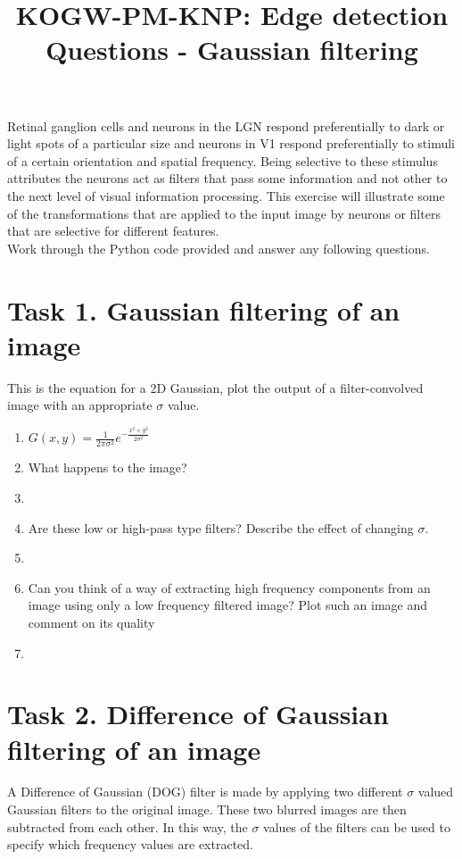 \documentclass[12pt,english]{scrartcl}
\title{KOGW-PM-KNP: Edge detection Questions - Gaussian filtering}
\begin{document}
\maketitle
\raggedright
Retinal ganglion cells and neurons in the LGN respond preferentially to dark or light spots of a particular size and neurons in V1 respond preferentially to stimuli of a certain orientation and spatial frequency. Being selective to these stimulus attributes the neurons act as filters that pass some information and not other to the next level of visual information processing. This exercise will illustrate some of the transformations that are applied to the input image by neurons or filters that are selective for different features.\\
\bigskip
Work through the Python code provided and answer any following questions. 

\section*{Task 1. Gaussian filtering of an image}
 This is the equation for a 2D Gaussian, plot the output of a filter-convolved image with an appropriate $\sigma$ value.
 
\begin{enumerate}
 \item[]
 \centering
 $G(x,y) = \frac{1}{2\pi\sigma^2} e^{-\frac{x^2+y^2}{2\sigma^2}}$ \\
 \raggedright
 \item What happens to the image? \\
 \item[]
 \color{black} 
 \item Are these low or high-pass type filters? Describe the effect of changing $\sigma$. \\
 \item[]
 \color{black}
 \item Can you think of a way of extracting high frequency components from an image using only a low frequency filtered image? Plot such an image and comment on its quality
 \item[]
 \end{enumerate}

\section*{Task 2. Difference of Gaussian filtering of an image}
A Difference of Gaussian (DOG) filter is made by applying two different $\sigma$ valued Gaussian filters to the original image. These two blurred images are then subtracted from each other. In this way, the $\sigma$ values of the filters can be used to specify which frequency values are extracted.
\end{document}
